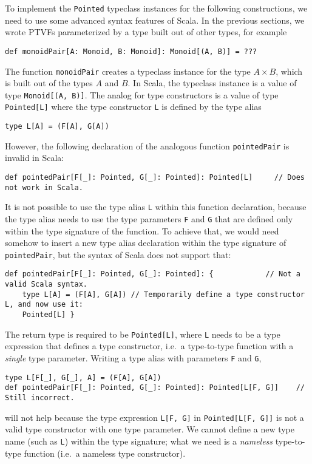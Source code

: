 To implement the \lstinline!Pointed! typeclass instances for the
following constructions, we need to use some advanced syntax features
of Scala. In the previous sections, we wrote PTVFs parameterized by
a type built out of other types, for example
\begin{lstlisting}
def monoidPair[A: Monoid, B: Monoid]: Monoid[(A, B)] = ???
\end{lstlisting}
The function \lstinline!monoidPair! creates a typeclass instance
for the type $A\times B$, which is built out of the types $A$ and
$B$. In Scala, the typeclass instance is a value of type \lstinline!Monoid[(A, B)]!.
The analog for type constructors is a value of type \lstinline!Pointed[L]!
where the type constructor \lstinline!L! is defined by the type alias
\begin{lstlisting}
type L[A] = (F[A], G[A])
\end{lstlisting}
However, the following declaration of the analogous function \lstinline!pointedPair!
is invalid in Scala:
\begin{lstlisting}
def pointedPair[F[_]: Pointed, G[_]: Pointed]: Pointed[L]     // Does not work in Scala.
\end{lstlisting}
It is not possible to use the type alias \lstinline!L! within this
function declaration, because the type alias needs to use the type
parameters \lstinline!F! and \lstinline!G! that are defined only
within the type signature of the function. To achieve that, we would
need somehow to insert a new type alias declaration within the type
signature of \lstinline!pointedPair!, but the syntax of Scala does
not support that:
\begin{lstlisting}
def pointedPair[F[_]: Pointed, G[_]: Pointed]: {            // Not a valid Scala syntax.
    type L[A] = (F[A], G[A]) // Temporarily define a type constructor L, and now use it:
    Pointed[L] }
\end{lstlisting}
The return type is required to be \lstinline!Pointed[L]!, where \lstinline!L!
needs to be a type expression that defines a type constructor, i.e.~a
type-to-type function with a \emph{single} type parameter. Writing
a type alias with parameters \lstinline!F! and \lstinline!G!,
\begin{lstlisting}
type L[F[_], G[_], A] = (F[A], G[A])
def pointedPair[F[_]: Pointed, G[_]: Pointed]: Pointed[L[F, G]]    // Still incorrect.
\end{lstlisting}
will not help because the type expression \lstinline!L[F, G]! in
\lstinline!Pointed[L[F, G]]! is not a valid type constructor with
one type parameter. We cannot define a new type name (such as \lstinline!L!)
within the type signature; what we need is a \emph{nameless} type-to-type
function (i.e.~a nameless type constructor).

